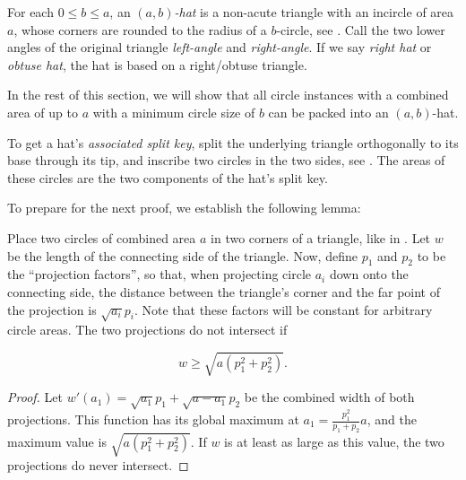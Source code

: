 \documentclass[a4paper,style=print,bibliography=totoc,nexus,lnum,extramargin]{tubsbook}
\begin{document}
\begin{definition}
    For each $0 \le b \le a$, an \emph{$(a,b)$-hat} is a non-acute triangle with an incircle of area $a$, whose corners are rounded to the radius of a $b$-circle, see .
    Call the two lower angles of the original triangle \emph{left-angle} and \emph{right-angle}.
    If we say \emph{right hat} or \emph{obtuse hat}, the hat is based on a right/obtuse triangle.
\end{definition}

\newcommand\defaulta{30}
\newcommand\defaultb{40}
\newcommand\defaultr{0.2}
\newcommand\defaultx{0.7}


In the rest of this section, we will show that all circle instances with a combined area of up to $a$ with a minimum circle size of $b$ can be packed into an $(a,b)$-hat.

\begin{definition}\label{def:hat-split-key}
    To get a hat's \emph{associated split key}, split the underlying triangle orthogonally to its base through its tip, and inscribe two circles in the two sides, see . The areas of these circles are the two components of the hat's split key.
\end{definition}


To prepare for the next proof, we establish the following lemma:

\begin{lemma}\label{th:overlap}
    Place two circles of combined area $a$ in two corners of a triangle, like in . Let $w$ be the length of the connecting side of the triangle. Now, define $p_1$ and $p_2$ to be the “projection factors”, so that, when projecting circle $a_i$ down onto the connecting side, the distance between the triangle's corner and the far point of the projection is $\sqrt{a_i}p_i$. Note that these factors will be constant for arbitrary circle areas. The two projections do not intersect if

    $$w \ge \sqrt{a(p_1^2 + p_2^2)}.$$
\end{lemma}

\begin{proof}
    Let $w'(a_1) = \sqrt{a_1}p_1 + \sqrt{a-a_1}p_2$ be the combined width of both projections. This function has its global maximum at $a_1 = \frac{p_1^2}{p_1+p_2}a$, and the maximum value is $\sqrt{a(p_1^2+p_2^2)}$. If $w$ is at least as large as this value, the two projections do never intersect.
\end{proof}
\end{document}
